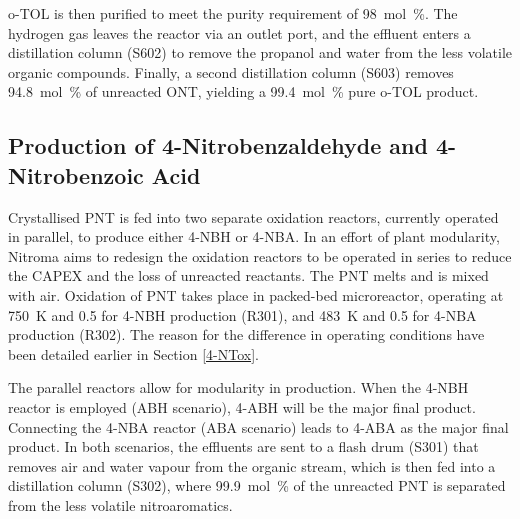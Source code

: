 
o-TOL is then purified to meet the purity requirement of \SI{98}{mol\percent}. The hydrogen gas leaves the reactor via an outlet port, and the effluent enters a distillation column (S602) to remove the propanol and water from the less volatile organic compounds. Finally, a second distillation column (S603) removes \SI{94.8}{mol\percent} of unreacted ONT, yielding a \SI{99.4}{mol\percent} pure o-TOL product.
 
\subsection{Production of 4-Nitrobenzaldehyde and 4-Nitrobenzoic Acid}
Crystallised PNT is fed into two separate oxidation reactors, currently operated in parallel, to produce either 4-NBH or 4-NBA. In an effort of plant modularity, Nitroma aims to redesign the oxidation reactors to be operated in series to reduce the CAPEX and the loss of unreacted reactants. The PNT melts and is mixed with air. Oxidation of PNT takes place in packed-bed microreactor, operating at \SI{750}{\K} and \SI{0.5}{\atm} for 4-NBH production (R301), and \SI{483}{\K} and \SI{0.5}{\atm} for 4-NBA production (R302). The reason for the difference in operating conditions have been detailed earlier in Section \ref{4-NTox}.


The parallel reactors allow for modularity in production. When the 4-NBH reactor is employed (ABH scenario), 4-ABH will be the major final product. Connecting the 4-NBA reactor (ABA scenario) leads to 4-ABA as the major final product. In both scenarios, the effluents are sent to a flash drum (S301) that removes air and water vapour from the organic stream, which is then fed into a distillation column (S302), where \SI{99.9}{mol\percent} of the unreacted PNT is separated from the less volatile nitroaromatics. 

